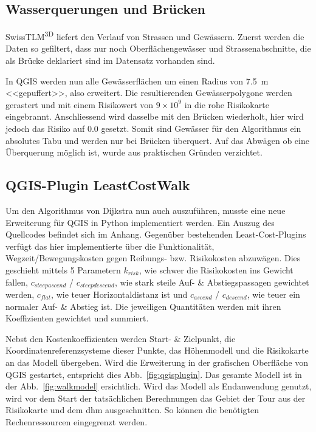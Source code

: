 \subsection{Wasserquerungen und Brücken}

SwissTLM\textsuperscript{3D} liefert den Verlauf von Strassen und Gewässern. Zuerst werden die Daten so gefiltert, dass nur noch Oberflächengewässer und Strassenabschnitte, die als Brücke deklariert sind im Datensatz vorhanden sind.

In QGIS werden nun alle Gewässerflächen um einen Radius von \qty{7.5}{m} <<gepuffert>>, also erweitert. Die resultierenden Gewässerpolygone werden gerastert und mit einem Risikowert von $9 \times 10^{9}$ in die rohe Risikokarte eingebrannt. Anschliessend wird dasselbe mit den Brücken wiederholt, hier wird jedoch das Risiko auf $0.0$ gesetzt. Somit sind Gewässer für den Algorithmus ein absolutes Tabu und werden nur bei Brücken überquert. Auf das Abwägen ob eine Überquerung möglich ist, wurde aus praktischen Gründen verzichtet.


\subsection{QGIS-Plugin LeastCostWalk}

Um den Algorithmus von Dijkstra nun auch auszuführen, musste eine neue Erweiterung für QGIS in Python implementiert werden. Ein Auszug des Quellcodes befindet sich im Anhang. Gegenüber bestehenden Least-Cost-Plugins verfügt das hier implementierte über die Funktionalität, Wegzeit/Bewegungskosten gegen Reibungs- bzw. Risikokosten abzuwägen. Dies geschieht mittels 5 Parametern $k_{risk}$, wie schwer die Risikokosten ins Gewicht fallen, $c_{steepascend}$ / $c_{steepdescend}$, wie stark steile Auf- \& Abstiegspassagen gewichtet werden, $c_{flat}$, wie teuer Horizontaldistanz ist und $c_{ascend}$ / $c_{descend}$, wie teuer ein normaler Auf- \& Abstieg ist. Die jeweiligen Quantitäten werden mit ihren Koeffizienten gewichtet und summiert.

Nebst den Kostenkoeffizienten werden Start- \& Zielpunkt, die Koordinatenreferenzsysteme dieser Punkte, das Höhenmodell und die Risikokarte an das Modell übergeben. Wird die Erweiterung in der grafischen Oberfläche von QGIS gestartet, entspricht dies Abb.\ \ref{fig:qgisplugin}. Das gesamte Modell ist in der Abb.\ \ref{fig:walkmodel} ersichtlich. Wird das Modell als Endanwendung genutzt, wird vor dem Start der tatsächlichen Berechnungen das Gebiet der Tour aus der Risikokarte und dem \acrshort{dhm} ausgeschnitten. So können die benötigten Rechenressourcen eingegrenzt werden.

